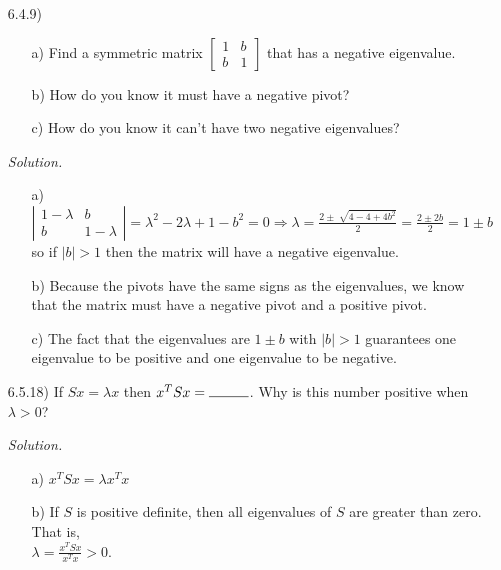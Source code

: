 \documentclass[12pt,pdftex]{article}
\begin{document}
\begin{itemize}
\item[6.4.9)] \begin{itemize} 
\item[a)] Find a symmetric matrix $\begin{bmatrix} 1 & b \\ b & 1 \end{bmatrix}$ that has a negative eigenvalue.
\item[b)] How do you know it must have a negative pivot?
\item[c)] How do you know it can't have two negative eigenvalues?
\end{itemize}

\textit{Solution.}
\begin{itemize}
\item[a)] $\left|\begin{matrix}1-\lambda & b \\ b & 1-\lambda\end{matrix}\right|=
			\lambda^2-2\lambda+1-b^2=0\Rightarrow
            \lambda=\frac{2\pm\sqrt[]{4-4+4b^2}}{2}=\frac{2\pm2b}{2}=1\pm b$ so if $|b|>1$ then the matrix will have a
            negative eigenvalue.
\item[b)] Because the pivots have the same signs as the eigenvalues, we know that the matrix must have a negative pivot and a positive pivot.
\item[c)] The fact that the eigenvalues are $1\pm b$ with $|b|>1$ guarantees one eigenvalue to be positive and one
			eigenvalue to be negative.
\end{itemize}

\item[6.5.18)] If $Sx=\lambda x$ then $x^TSx=\rule{1cm}{0.15mm}$. Why is this number positive when $\lambda>0$?

\textit{Solution.}
\begin{itemize}
\item[a)] $x^TSx=\lambda x^Tx$
\item[b)] If $S$ is positive definite, then all eigenvalues of $S$ are greater than zero. That is, \\
		$\lambda=\frac{x^TSx}{x^Tx} > 0$.
\end{itemize}


\end{itemize}
\end{document}
